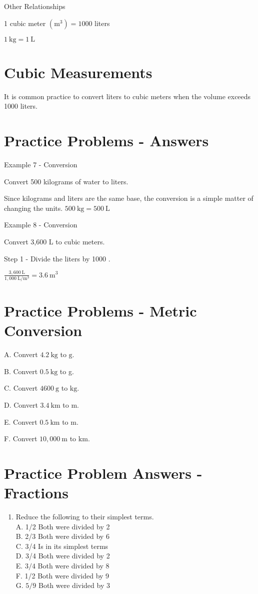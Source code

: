 Other Relationships

1 cubic meter $\left(\mathrm{m}^{3}\right)=1000$ liters

$1 \mathrm{~kg}=1 \mathrm{~L}$

\section{Cubic Measurements}
It is common practice to convert liters to cubic meters when the volume exceeds 1000 liters.

\section{Practice Problems - Answers}
Example 7 - Conversion

Convert 500 kilograms of water to liters.

Since kilograms and liters are the same base, the conversion is a simple matter of changing the units. $500 \mathrm{~kg}=500 \mathrm{~L}$

Example 8 - Conversion

Convert 3,600 L to cubic meters.

Step 1 - Divide the liters by 1000 .

$\frac{3,600 \mathrm{~L}}{1,000 \mathrm{~L} / \mathrm{m}^{3}}=3.6 \mathrm{~m}^{3}$

\section{Practice Problems - Metric Conversion}
A. Convert $4.2 \mathrm{~kg}$ to $\mathrm{g}$.

B. Convert $0.5 \mathrm{~kg}$ to g.

C. Convert $4600 \mathrm{~g}$ to $\mathrm{kg}$.

D. Convert $3.4 \mathrm{~km}$ to $\mathrm{m}$.

E. Convert $0.5 \mathrm{~km}$ to $\mathrm{m}$.

F. Convert $10,000 \mathrm{~m}$ to $\mathrm{km}$.

\section{Practice Problem Answers - Fractions}
\begin{enumerate}
  \item Reduce the following to their simplest terms.\\
A. 1/2 Both were divided by 2\\
B. 2/3 Both were divided by 6\\
C. 3/4 Is in its simplest terms\\
D. 3/4 Both were divided by 2\\
E. $3 / 4$ Both were divided by 8\\
F. 1/2 Both were divided by 9\\
G. $5 / 9$ Both were divided by 3
\end{enumerate}
